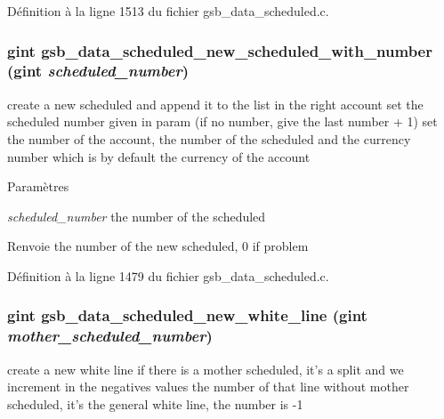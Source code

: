 Définition à la ligne 1513 du fichier gsb\_\-data\_\-scheduled.c.

\subsubsection[{gsb\_\-data\_\-scheduled\_\-new\_\-scheduled\_\-with\_\-number}]{\setlength{\rightskip}{0pt plus 5cm}gint gsb\_\-data\_\-scheduled\_\-new\_\-scheduled\_\-with\_\-number (gint {\em scheduled\_\-number})}\label{gsb__data__scheduled_8h_af1bd07298abcb5c324662e26fd250728}
create a new scheduled and append it to the list in the right account set the scheduled number given in param (if no number, give the last number + 1) set the number of the account, the number of the scheduled and the currency number which is by default the currency of the account


\begin{DoxyParams}{Paramètres}
\item[{\em scheduled\_\-number}]the number of the scheduled\end{DoxyParams}
\begin{DoxyReturn}{Renvoie}
the number of the new scheduled, 0 if problem 
\end{DoxyReturn}


Définition à la ligne 1479 du fichier gsb\_\-data\_\-scheduled.c.

\subsubsection[{gsb\_\-data\_\-scheduled\_\-new\_\-white\_\-line}]{\setlength{\rightskip}{0pt plus 5cm}gint gsb\_\-data\_\-scheduled\_\-new\_\-white\_\-line (gint {\em mother\_\-scheduled\_\-number})}\label{gsb__data__scheduled_8h_ae06f8ce3a70b0bd8b4fe04b955c9c18b}
create a new white line if there is a mother scheduled, it's a split and we increment in the negatives values the number of that line without mother scheduled, it's the general white line, the number is -\/1

